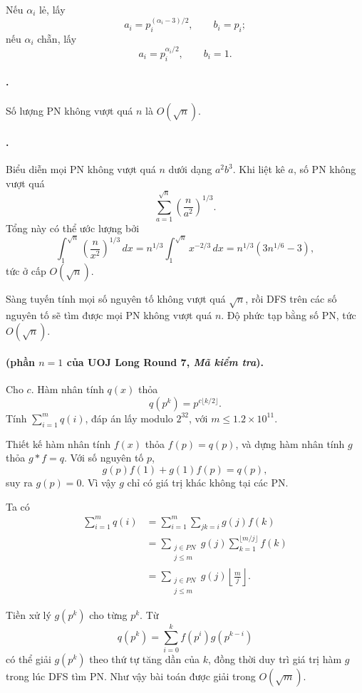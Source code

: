 \documentclass[11pt]{article}
\begin{document}
Nếu \(\alpha_i\) lẻ, lấy
\[
  a_i=p_i^{(\alpha_i-3)/2},\qquad b_i=p_i;
\]
nếu \(\alpha_i\) chẵn, lấy
\[
  a_i=p_i^{\alpha_i/2},\qquad b_i=1.
\]

\paragraph{.}
Số lượng PN không vượt quá \(n\) là \(O(\sqrt n)\).

\paragraph{.}
Biểu diễn mọi PN không vượt quá \(n\) dưới dạng \(a^2b^3\). Khi liệt kê \(a\),
số PN không vượt quá
\[
  \sum_{a=1}^{\sqrt n}\left(\frac{n}{a^2}\right)^{1/3}.
\]
Tổng này có thể ước lượng bởi
\[
  \int_1^{\sqrt n}\left(\frac{n}{x^2}\right)^{1/3}\,dx
  = n^{1/3}\int_1^{\sqrt n} x^{-2/3}\,dx
  = n^{1/3}(3n^{1/6}-3),
\]
tức ở cấp \(O(\sqrt n)\).

Sàng tuyến tính mọi số nguyên tố không vượt quá \(\sqrt n\), rồi DFS trên các
số nguyên tố sẽ tìm được mọi PN không vượt quá \(n\). Độ phức tạp bằng số PN,
tức \(O(\sqrt n)\).

\paragraph{ (phần \(n=1\) của UOJ Long Round 7,
\emph{Mã kiểm tra}).}
Cho \(c\). Hàm nhân tính \(q(x)\) thỏa
\[
  q(p^k)=p^{c\lfloor k/2\rfloor}.
\]
Tính \(\sum_{i=1}^{m} q(i)\), đáp án lấy modulo \(2^{32}\), với
\(m\le 1.2\times 10^{11}\).

Thiết kế hàm nhân tính \(f(x)\) thỏa \(f(p)=q(p)\), và dựng hàm nhân tính
\(g\) thỏa \(g*f=q\). Với số nguyên tố \(p\),
\[
  g(p)f(1)+g(1)f(p)=q(p),
\]
suy ra \(g(p)=0\). Vì vậy \(g\) chỉ có giá trị khác không tại các PN.

Ta có
\[
\begin{aligned}
  \sum_{i=1}^{m} q(i)
  &= \sum_{i=1}^{m}\sum_{jk=i} g(j)f(k) \\
  &= \sum_{\substack{j\in PN\\j\le m}} g(j)
     \sum_{k=1}^{\lfloor m/j\rfloor} f(k) \\
  &= \sum_{\substack{j\in PN\\j\le m}} g(j)\left\lfloor\frac{m}{j}\right\rfloor.
\end{aligned}
\]

Tiền xử lý \(g(p^k)\) cho từng \(p^k\). Từ
\[
  q(p^k)=\sum_{i=0}^{k} f(p^i)g(p^{k-i})
\]
có thể giải \(g(p^k)\) theo thứ tự tăng dần của \(k\), đồng thời duy trì giá
trị hàm \(g\) trong lúc DFS tìm PN. Như vậy bài toán được giải trong
\(O(\sqrt m)\).
\end{document}
